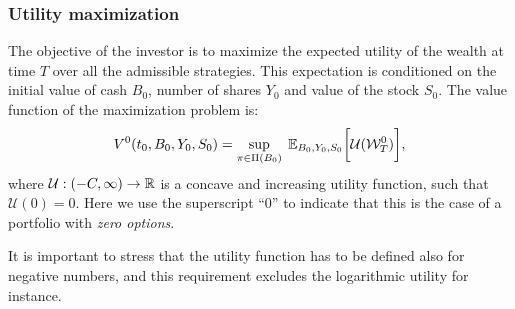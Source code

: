 \subsubsection{Utility maximization}

The objective of the investor is to maximize the expected utility of the wealth at time $T$ over all the admissible
strategies. This expectation is conditioned on the initial value of cash $B_0$, number of shares $Y_0$ and value of the
stock $S_0$.
The value function of the maximization problem is:
\begin{equation}\label{DPZ_max_probl0}
V^0(t_0,B_0,Y_0,S_0) = \sup_{\pi \in \Pi(B_0)} \;  \mathbb{E}_{B_0,Y_0,S_0}\biggl[ 
            \mathcal{U}(\mathcal{W}^0_T) \biggr], 
\end{equation}
where $\mathcal{U}: (-C,\infty) \to \mathbb{R}$ is a concave and increasing utility function, such that $\mathcal{U}(0)=0$. 
Here we use the superscript ``$0$'' to indicate that this is the case of a portfolio with \emph{zero options}. 
\begin{Remark}
It is important to stress that the utility function
has to be defined also for negative numbers, and this requirement excludes the logarithmic utility for instance.
\end{Remark}

